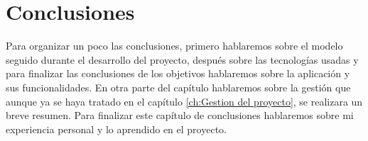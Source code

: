 \chapter{Conclusiones}
\label{ch:Conclusiones}
Para organizar un poco las conclusiones, primero hablaremos sobre el modelo seguido durante el desarrollo del proyecto, después sobre las tecnologías usadas y para finalizar las conclusiones de los objetivos hablaremos sobre la aplicación y sus funcionalidades. En otra parte del capítulo hablaremos sobre la gestión que aunque ya se haya tratado en el capítulo \ref{ch:Gestion del proyecto}, se realizara un breve resumen. Para finalizar este capítulo de conclusiones hablaremos sobre mi experiencia personal y lo aprendido en el proyecto.
\newpage

\newpage

\newpage





























